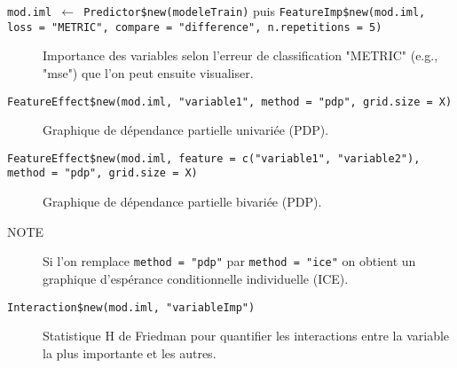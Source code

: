 \documentclass[10pt, french]{article}\usepackage[]{graphicx}\usepackage[]{color}
\begin{document}
\pagebreak

\begin{description}
	\item[\texttt{mod.iml $\leftarrow$ Predictor\$new(modeleTrain)} puis \texttt{FeatureImp\$new(mod.iml, loss = "METRIC", compare = "difference",  n.repetitions = 5)}]		Importance des variables selon l'erreur de classification "METRIC" (e.g., "mse") que l'on peut ensuite visualiser.
	\item[\texttt{FeatureEffect\$new(mod.iml, "variable1", method = "pdp", grid.size = X)}]	Graphique de dépendance partielle univariée (PDP).
	\item[\texttt{FeatureEffect\$new(mod.iml, feature = c("variable1", "variable2"), method = "pdp", grid.size = X)}]	Graphique de dépendance partielle bivariée (PDP).
	\item[NOTE]	Si l'on remplace \texttt{method = "pdp"} par \texttt{method = "ice"} on obtient un graphique d'espérance conditionnelle individuelle (ICE).
	\item[\texttt{Interaction\$new(mod.iml, "variableImp")}]	Statistique H de Friedman pour quantifier les interactions entre la variable la plus importante et les autres.
\end{description}
\end{document}
